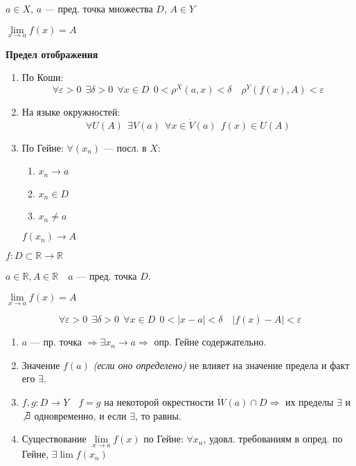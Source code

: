 $a\in X$, $a$ --- пред. точка множества $D$, $A\in Y$

$\lim\limits_{x\to a}f(x)=A$

\begin{definition}
    \textbf{Предел отображения}
    \begin{enumerate}
    \item По Коши:
    $$\forall \varepsilon>0 \ \ \exists \delta>0 \ \ \forall x\in D \ \ 0<\rho^X(a,x)<\delta \quad \rho^Y(f(x), A) < \varepsilon$$
    \item На языке окружностей:
    $$\forall U(A) \ \ \exists V(a) \ \ \forall x\in \dot V(a) \ \ f(x)\in U(A)$$
    \item По Гейне: $\forall (x_n)$ --- посл. в $X$:
    \begin{enumerate}
        \item $x_n\to a$
        \item $x_n\in D$
        \item $x_n\not = a$
    \end{enumerate}
    $f(x_n)\to A$
    \end{enumerate}
\end{definition}

\begin{consequence}
    $f:D\subset\mathbb{R} \to \mathbb{R}$
    
    $a\in\mathbb{R}, A\in\mathbb{R} \quad a$ --- пред. точка $D$.

    $\lim\limits_{x\to a} f(x)=A$

    $$\forall \varepsilon > 0 \ \ \exists \delta>0 \ \ \forall x\in D \ \ 0<|x-a|<\delta \quad |f(x)-A|<\varepsilon$$
\end{consequence}

\begin{remark}
    \begin{enumerate}
        \item $a$ --- пр. точка $\Rightarrow \exists x_n\to a \Rightarrow$ опр. Гейне содержательно.
        \item Значение $f(a)$ \textit{(если оно определено)} не влияет на значение предела и факт его $\exists$.
        \item $f,g:D\to Y \quad f=g$ на некоторой окрестности $\dot W(a)\cap D \Rightarrow$ их пределы $\exists$ и $\not \exists$ одновременно, и если $\exists$, то равны.
        \item Существование $\lim\limits_{x\to a} f(x)$ по Гейне: $\forall x_n$, удовл. требованиям в опред. по Гейне, $\exists\lim f(x_n)$
    \end{enumerate}
\end{remark}

